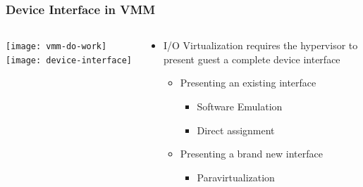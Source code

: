 \begin{frame}
	\frametitle{Device Interface in VMM}
	
	
	
	\begin{columns}
		
		\begin{column}{.4\textwidth}
			\centering
			\texttt{[image: vmm-do-work]}
			\texttt{[image: device-interface]}
		\end{column}
		
		\begin{column}{.6\textwidth}
			
			\begin{itemize}
				\item I/O Virtualization requires the hypervisor to present guest a complete device interface
				\begin{itemize}
					\item Presenting an existing interface
    				\begin{itemize}
    					\item  {\color{blue}Software Emulation}
    					\item  {\color{blue}Direct assignment}
    				\end{itemize} 
					
				\item Presenting a brand new interface
				\begin{itemize}
					\item {\color{blue}Paravirtualization}
					
				\end{itemize} 
				\end{itemize} 
			\end{itemize} 	
			
			
		\end{column}
		
		
	\end{columns}
	
	
\end{frame}


